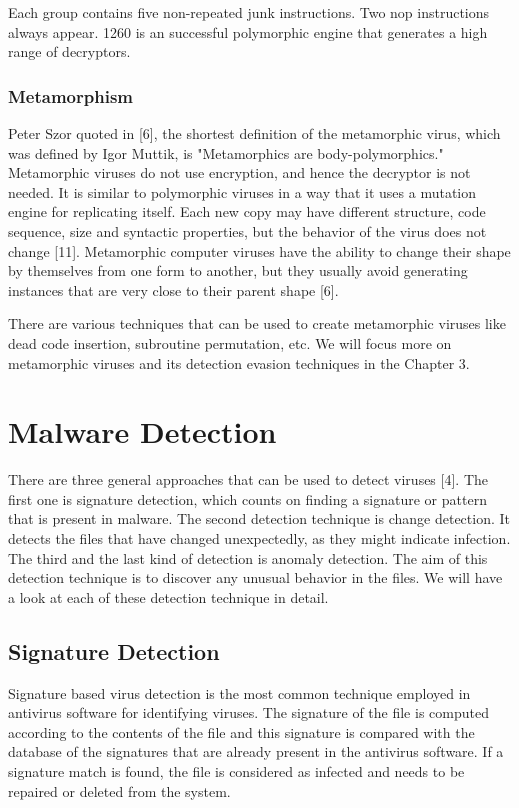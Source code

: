Each group contains five non-repeated junk instructions. Two nop instructions always appear. 1260 is an successful polymorphic engine that generates a high range of decryptors.

\subsubsection{Metamorphism}
Peter Szor quoted in [6], the shortest definition of the metamorphic virus, which was defined by Igor Muttik, is "Metamorphics are body-polymorphics."  Metamorphic viruses do not use encryption, and hence the decryptor is not needed. It is similar to polymorphic viruses in a way that it uses a mutation engine for replicating itself. Each new copy may have different structure, code sequence, size and syntactic properties, but the behavior of the virus does not change [11]. Metamorphic computer viruses have the ability to change their shape by themselves from one form to another, but they usually avoid generating instances that are very close to their parent shape [6].

There are various techniques that can be used to create metamorphic viruses like dead code insertion, subroutine permutation, etc. We will focus more on metamorphic viruses and its detection evasion techniques in the Chapter 3.

\section{Malware Detection}
There are three general approaches that can be used to detect viruses [4]. The first one is signature detection, which counts on finding a signature or pattern that is present in malware. The second detection technique is change detection. It detects the files that have changed unexpectedly, as they might indicate infection. The third and the last kind of detection is anomaly detection. The aim of this detection technique is to discover any unusual behavior in the files. We will have a look at each of these detection technique in detail.

\subsection{Signature Detection}
Signature based virus detection is the most common technique employed in antivirus software for identifying viruses. The signature of the file is computed according to the contents of the file and this signature is compared with the database of the signatures that are already present in the antivirus software. If a signature match is found, the file is considered as infected and needs to be repaired or deleted from the system.

